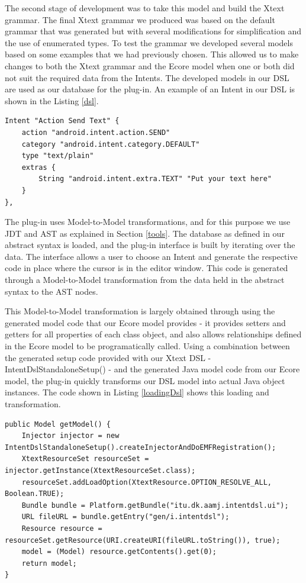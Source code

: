 The second stage of development was to take this model and build the Xtext grammar. The final Xtext grammar we produced was based on the default grammar that was generated but with several modifications for simplification and the use of enumerated types. To test the grammar we developed several models based on some examples that we had previously chosen. This allowed us to make changes to both the Xtext grammar and the Ecore model when one or both did not suit the required data from the Intents. The developed models in our DSL are used as our database for the plug-in. An example of an Intent in our DSL is shown in the Listing \ref{dsl}.

{\footnotesize\begin{lstlisting}[escapechar=!,label=dsl,caption=Intent in DSL]
Intent "Action Send Text" {
	action "android.intent.action.SEND"
	category "android.intent.category.DEFAULT"
	type "text/plain"
	extras {
		String "android.intent.extra.TEXT" "Put your text here"
	}
},
\end{lstlisting}}

The plug-in uses Model-to-Model transformations, and for this purpose we use JDT and AST as explained in Section \ref{tools}. The database as defined in our abstract syntax is loaded, and the plug-in interface is built by iterating over the data. The interface allows a user to choose an Intent and generate the respective code in place where the cursor is in the editor window. This code is generated through a Model-to-Model transformation from the data held in the abstract syntax to the AST nodes.

This Model-to-Model transformation is largely obtained through using the generated model code that our Ecore model provides - it provides setters and getters for all properties of each class object, and also allows relationships defined in the Ecore model to be programatically called. Using a combination between the generated setup code provided with our Xtext DSL - IntentDslStandaloneSetup() - and the generated Java model code from our Ecore model, the plug-in quickly transforms our DSL model into actual Java object instances. The code shown in Listing \ref{loadingDsl} shows this loading and transformation.

{\footnotesize\begin{lstlisting}[label=loadingDsl,caption=Loading a DSL object into a standalone Java application]
public Model getModel() {
	Injector injector = new IntentDslStandaloneSetup().createInjectorAndDoEMFRegistration();
	XtextResourceSet resourceSet = injector.getInstance(XtextResourceSet.class);
	resourceSet.addLoadOption(XtextResource.OPTION_RESOLVE_ALL, Boolean.TRUE);
	Bundle bundle = Platform.getBundle("itu.dk.aamj.intentdsl.ui");
	URL fileURL = bundle.getEntry("gen/i.intentdsl");
	Resource resource = resourceSet.getResource(URI.createURI(fileURL.toString()), true);
	model = (Model) resource.getContents().get(0);
	return model;
}
\end{lstlisting}}

